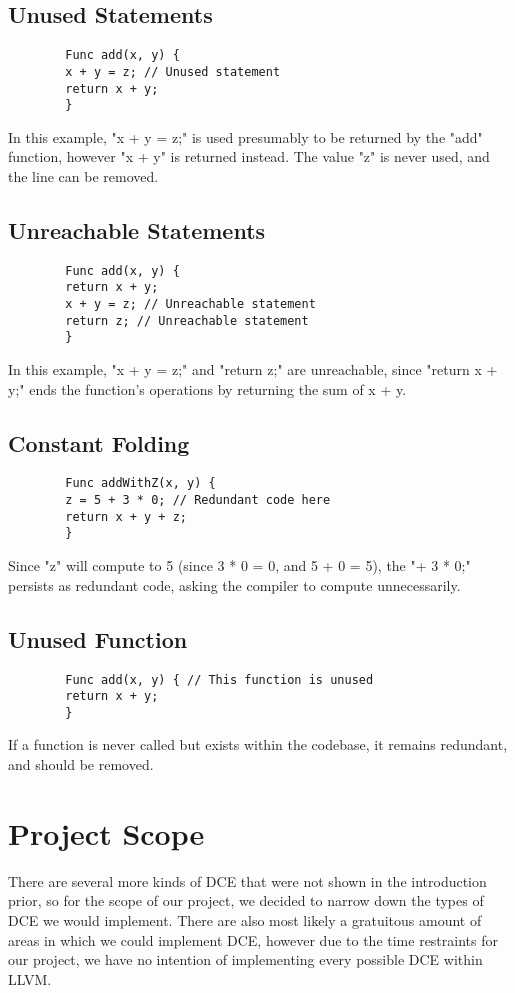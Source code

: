 \documentclass[sigplan,screen]{acmart}
\begin{document}
    \subsection{Unused Statements}
    \begin{verbatim}
        Func add(x, y) {
        x + y = z; // Unused statement
        return x + y;
	    }
    \end{verbatim}
    In this example, "x + y = z;" is used presumably to be returned by the "add" function, however "x + y" is returned instead. The value "z" is never used, and the line can be removed.
    
    \subsection{Unreachable Statements}
    \begin{verbatim}
        Func add(x, y) {
        return x + y;
        x + y = z; // Unreachable statement
        return z; // Unreachable statement
        }
    \end{verbatim}
    In this example, "x + y = z;" and "return z;" are unreachable, since "return x + y;" ends the function's operations by returning the sum of x + y.
    
    \subsection{Constant Folding}
    \begin{verbatim}
        Func addWithZ(x, y) {
        z = 5 + 3 * 0; // Redundant code here
        return x + y + z;
        }
    \end{verbatim}
    Since "z" will compute to 5 (since 3 * 0 = 0, and 5 + 0 = 5), the "+ 3 * 0;" persists as redundant code, asking the compiler to compute unnecessarily.

    \subsection{Unused Function}
    \begin{verbatim}
        Func add(x, y) { // This function is unused
        return x + y;
        }
    \end{verbatim}
    If a function is never called but exists within the codebase, it remains redundant, and should be removed.

\section{Project Scope}
    There are several more kinds of DCE that were not shown in the introduction prior, so for the scope of our project, we decided to narrow down the types of DCE we would implement. There are also most likely a gratuitous amount of areas in which we could implement DCE, however due to the time restraints for our project, we have no intention of implementing every possible DCE within LLVM.
\end{document}
